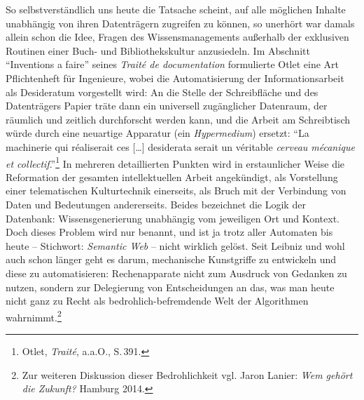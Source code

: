 So selbstverständlich uns heute die Tatsache scheint, auf alle möglichen
Inhalte unabhängig von ihren Datenträgern zugreifen zu können, so
unerhört war damals allein schon die Idee, Fragen des Wissensmanagements
außerhalb der exklusiven Routinen einer Buch- und Bibliothekskultur
anzusiedeln. Im Abschnitt \enquote{Inventions a faire} seines
\emph{Traité de documentation} formulierte Otlet eine Art Pflichtenheft
für Ingenieure, wobei die Automatisierung der Informationsarbeit als
Desideratum vorgestellt wird: An die Stelle der Schreibfläche und des
Datenträgers Papier träte dann ein universell zugänglicher Datenraum,
der räumlich und zeitlich durchforscht werden kann, und die Arbeit am
Schreibtisch würde durch eine neuartige Apparatur (ein
\emph{Hypermedium}) ersetzt: \enquote{La machinerie qui réaliserait ces
{[}\ldots{}{]} desiderata serait un véritable \emph{cerveau mécanique et
collectif}.}\footnote{Otlet, \emph{Traité}, a.a.O., S.\,391.} In mehreren
detaillierten Punkten wird in erstaunlicher Weise die Reformation der
gesamten intellektuellen Arbeit angekündigt, als Vorstellung einer
telematischen Kulturtechnik einerseits, als Bruch mit der Verbindung von
Daten und Bedeutungen andererseits. Beides bezeichnet die Logik der
Datenbank: Wissensgenerierung unabhängig vom jeweiligen Ort und Kontext.
Doch dieses Problem wird nur benannt, und ist ja trotz aller Automaten
bis heute -- Stichwort: \emph{Semantic Web} -- nicht wirklich gelöst.
Seit Leibniz und wohl auch schon länger geht es darum, mechanische
Kunstgriffe zu entwickeln und diese zu automatisieren: Rechenapparate
nicht zum Ausdruck von Gedanken zu nutzen, sondern zur Delegierung von
Entscheidungen an das, was man heute nicht ganz zu Recht als
bedrohlich-befremdende Welt der Algorithmen wahrnimmt.\footnote{Zur
  weiteren Diskussion dieser Bedrohlichkeit vgl. Jaron Lanier: \emph{Wem
  gehört die Zukunft?} Hamburg 2014.}
